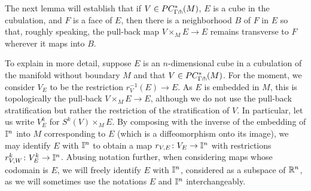 \begin{comment}
\begin{lemma}\label{L:submersion}
	Suppose $V$ and $M$ are manifolds without boundary, that $N$ is a submanifold without boundary of $M$, and that $f \colon V \to M$ is a submersion at a point $x \in V$ with $r_V(x) \in N$.
	Then the pullback map $V_N = V \times_M N \to N$ is a submersion at $(x, r_V(x))$, identifying $N$ with its image in $M$.
\end{lemma}
\begin{proof}
	Let use write $r_V(x) = z \in N \subset M$.
	By \cite[Lemma 2.28 and Corollary 2.29]{medina2022foundations}, the tangent space of $V_N$ at $(x, z)$ is $T_{(x,z)}V_N = T_xV \times_{T_zM} T_zN$, and the derivative map $T_{(x,z)}V_N \to T_zN$ is just the projection.
	As the restriction of $r_V$ to $V$ is a submersion at $z$, the image of $Dr_V \colon T_xV \to T_zM$ is the whole space, and so for any $\vec b \in T_z N$, there is a vector $\vec a \in T_xV$ such that $(\vec a, \vec b) \in T_{(x,z)}V_N$.
	The derivative then maps $(\vec a, \vec b)$ to $\vec b \in T_z N$. But $\vec b$ was chosen arbitrarily in $T_zN$, so the pullback is a submersion at $(x,z)$.
\end{proof}

\end{comment}

The next lemma will establish that if $V \in PC^*_{\Gamma \pitchfork}(M)$, $E$ is a cube in the cubulation, and $F$ is a face of $E$, then there is a neighborhood $B$ of $F$ in $E$ so that, roughly speaking, the pull-back map $V \times_M E \to E$ remains transverse to $F$ wherever it maps into $B$.

To explain in more detail, suppose $E$ is an $n$-dimensional cube in a cubulation of the manifold without boundary $M$ and that $V \in PC^*_{\Gamma \pitchfork}(M)$.
For the moment, we consider $V_E$ to be the restriction $r_V^{-1}(E) \to E$.
As $E$ is embedded in $M$, this is topologically the pull-back $V \times_M E \to E$, although we do not use the pull-back stratification but rather the restriction of the stratification of $V$.
In particular, let us write $V_E^k$ for $S^k(V) \times_M E$.
By composing with the inverse of the embedding of $\mathbb{I}^n$ into $M$ corresponding to $E$ (which is a diffeomorphism onto its image), we may identify $E$ with $\mathbb{I}^n$ to obtain a map $r_{V,E} \colon V_E \to \mathbb{I}^n$ with restrictions $r_{V,W}^k \colon V_E^k \to \mathbb{I}^n$.
Abusing notation further, when considering maps whose codomain is $E$, we will freely identify $E$ with $\mathbb{I}^n$, considered as a subspace of $\mathbb{R}^n$, as we will sometimes use the notations $E$ and $\mathbb{I}^n$ interchangeably.

